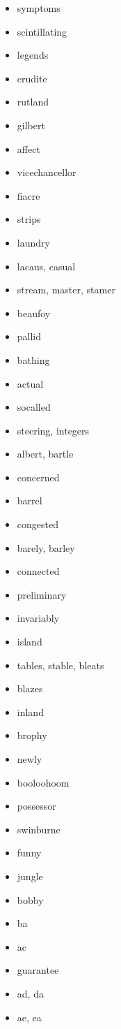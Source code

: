 \documentclass{article}
\begin{document}
\begin{itemize}
    \item symptoms
    \item scintillating
    \item legends
    \item erudite
    \item rutland
    \item gilbert
    \item affect
    \item vicechancellor
    \item fiacre
    \item strips
    \item laundry
    \item lacaus, casual
    \item stream, master, stamer
    \item beaufoy
    \item pallid
    \item bathing
    \item actual
    \item socalled
    \item steering, integers
    \item albert, bartle
    \item concerned
    \item barrel
    \item congested
    \item barely, barley
    \item connected
    \item preliminary
    \item invariably
    \item island
    \item tables, stable, bleats
    \item blazes
    \item inland
    \item brophy
    \item newly
    \item booloohoom
    \item possessor
    \item swinburne
    \item funny
    \item jungle
    \item bobby
    \item ba
    \item ac
    \item guarantee
    \item ad, da
    \item ae, ea

\end{itemize}
\end{document}
